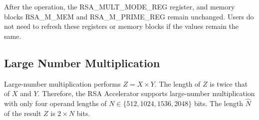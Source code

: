 \documentclass[main\_\_EN.tex]{subfiles}
\begin{document}
After the operation, the RSA\_MULT\_MODE\_REG register, and memory blocks RSA\_M\_MEM and RSA\_M\_PRIME\_REG remain unchanged. Users do not need to refresh these registers or memory blocks if the values remain the same.

\subsection{Large Number Multiplication}

Large-number multiplication performs \begin{math}Z = X \times Y\end{math}.
The length of \begin{math}Z\end{math} is twice that of \begin{math}X\end{math} and \begin{math}Y\end{math}. Therefore, the RSA Accelerator supports large-number multiplication with only four operand lengths of \begin{math}N \in \{512,1024,1536,2048\}\end{math} bits. The length \begin{math}\hat{N}\end{math} of the result \begin{math}Z\end{math} is \begin{math}2 \times N\end{math} bits.
\end{document}
